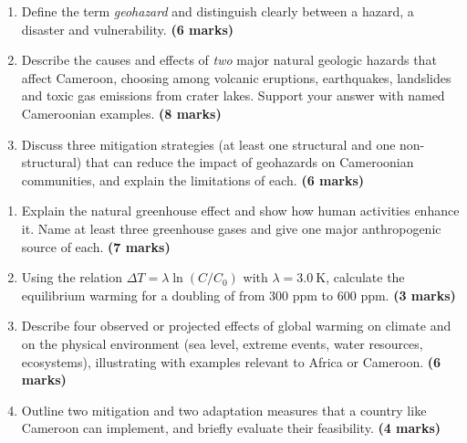 \documentclass[11pt]{article}
\begin{document}
\begin{exercice}
\begin{enumerate}
\item Define the term \emph{geohazard} and distinguish clearly between a hazard, a disaster and vulnerability. \textbf{(6 marks)}
\item Describe the causes and effects of \emph{two} major natural geologic hazards that affect Cameroon, choosing among volcanic eruptions, earthquakes, landslides and toxic gas emissions from crater lakes. Support your answer with named Cameroonian examples. \textbf{(8 marks)}
\item Discuss three mitigation strategies (at least one structural and one non-structural) that can reduce the impact of geohazards on Cameroonian communities, and explain the limitations of each. \textbf{(6 marks)}
\end{enumerate}
\end{exercice}

\begin{exercice}
\begin{enumerate}
\item Explain the natural greenhouse effect and show how human activities enhance it. Name at least three greenhouse gases and give one major anthropogenic source of each. \textbf{(7 marks)}
\item Using the relation $\Delta T = \lambda \ln(C/C_0)$ with $\lambda = \SI{3.0}{\kelvin}$, calculate the equilibrium warming for a doubling of  from 300 ppm to 600 ppm. \textbf{(3 marks)}
\item Describe four observed or projected effects of global warming on climate and on the physical environment (sea level, extreme events, water resources, ecosystems), illustrating with examples relevant to Africa or Cameroon. \textbf{(6 marks)}
\item Outline two mitigation and two adaptation measures that a country like Cameroon can implement, and briefly evaluate their feasibility. \textbf{(4 marks)}
\end{enumerate}
\end{exercice}
\end{document}
